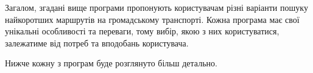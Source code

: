 Загалом, згадані вище програми пропонують користувачам різні варіанти пошуку найкоротших маршрутів на громадському транспорті. Кожна програма має свої унікальні особливості та переваги, тому вибір, якою з них користуватися, залежатиме від потреб та вподобань користувача.


Нижче кожну з програм буде розглянуто більш детально.









